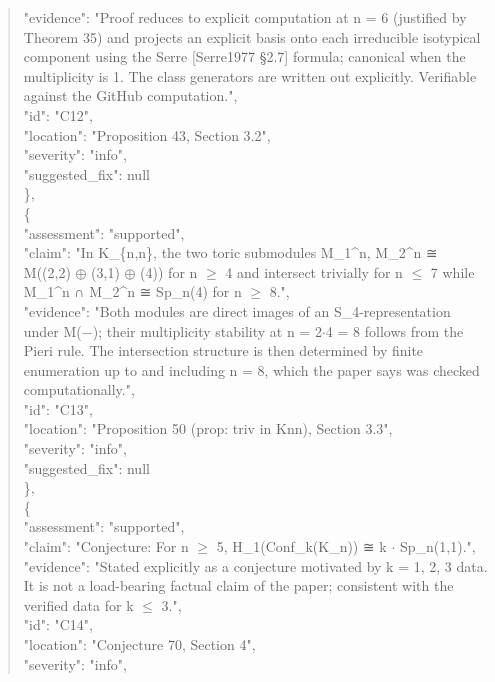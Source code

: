 \documentclass[11pt]{article}
\begin{document}
\begin{quote}
      "evidence": "Proof reduces to explicit computation at n = 6 (justified by Theorem 35) and projects an explicit basis onto each irreducible isotypical component using the Serre [Serre1977 §2.7] formula; canonical when the multiplicity is 1. The class generators are written out explicitly. Verifiable against the GitHub computation.",\\
      "id": "C12",\\
      "location": "Proposition 43, Section 3.2",\\
      "severity": "info",\\
      "suggested\_fix": null\\
    \},\\
    \{\\
      "assessment": "supported",\\
      "claim": "In K\_\{n,n\}, the two toric submodules M\_1\^{}n, M\_2\^{}n ≅ M((2,2) \ensuremath{\oplus} (3,1) \ensuremath{\oplus} (4)) for n \ensuremath{\ge} 4 and intersect trivially for n \ensuremath{\le} 7 while M\_1\^{}n ∩ M\_2\^{}n ≅ Sp\_n(4) for n \ensuremath{\ge} 8.",\\
      "evidence": "Both modules are direct images of an S\_4-representation under M(\ensuremath{-}); their multiplicity stability at n = 2\ensuremath{\cdot}4 = 8 follows from the Pieri rule. The intersection structure is then determined by finite enumeration up to and including n = 8, which the paper says was checked computationally.",\\
      "id": "C13",\\
      "location": "Proposition 50 (prop: triv in Knn), Section 3.3",\\
      "severity": "info",\\
      "suggested\_fix": null\\
    \},\\
    \{\\
      "assessment": "supported",\\
      "claim": "Conjecture: For n \ensuremath{\ge} 5, H\_1(Conf\_k(K\_n)) ≅ k \ensuremath{\cdot} Sp\_n(1,1).",\\
      "evidence": "Stated explicitly as a conjecture motivated by k = 1, 2, 3 data. It is not a load-bearing factual claim of the paper; consistent with the verified data for k \ensuremath{\le} 3.",\\
      "id": "C14",\\
      "location": "Conjecture 70, Section 4",\\
      "severity": "info",\\

\end{quote}
\end{document}

